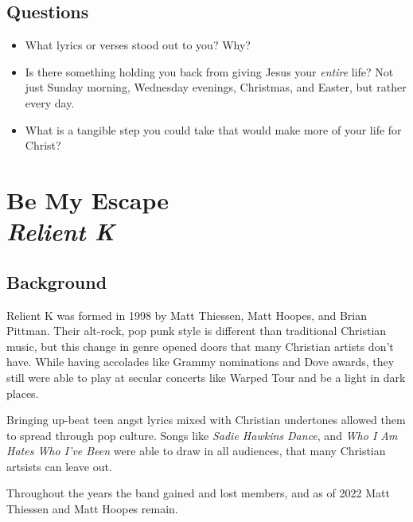 \documentclass[10pt,a4paper,oneside,twocolumn]{book}
\newcommand\Chapter[2]{
  \chapter[#1: {\itshape#2}]{#1\\[2ex]\Large\itshape#2}
}
\begin{document}
\section{Questions}
\begin{itemize}
\item What lyrics or verses stood out to you? Why?

\item Is there something holding you back from giving Jesus your \textit{entire} life? Not just Sunday morning, Wednesday evenings, Christmas, and Easter, but rather every day. 

\item What is a tangible step you could take that would make more of your life for Christ?
\end{itemize}

\Chapter{Be My Escape}{Relient K}
\section{Background}
Relient K was formed in 1998 by Matt Thiessen, Matt Hoopes, and Brian Pittman. Their alt-rock, pop punk style is different than traditional Christian music, but this change in genre opened doors that many Christian artists don't have. While having accolades like Grammy nominations and Dove awards, they still were able to play at secular concerts like Warped Tour and be a light in dark places.

Bringing up-beat teen angst lyrics mixed with Christian undertones allowed them to spread through pop culture. Songs like \textit{Sadie Hawkins Dance}, and \textit{Who I Am Hates Who I've Been} were able to draw in all audiences, that many Christian artsists can leave out.

Throughout the years the band gained and lost members, and as of 2022 Matt Thiessen and Matt Hoopes remain. 
\end{document}

